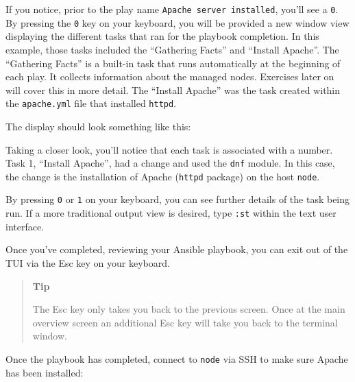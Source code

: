 If you notice, prior to the play name
\texttt{Apache\ server\ installed}, you'll see a \texttt{0}. By pressing
the \texttt{0} key on your keyboard, you will be provided a new window
view displaying the different tasks that ran for the playbook
completion. In this example, those tasks included the ``Gathering
Facts'' and ``Install Apache''. The ``Gathering Facts'' is a built-in
task that runs automatically at the beginning of each play. It collects
information about the managed nodes. Exercises later on will cover this
in more detail. The ``Install Apache'' was the task created within the
\texttt{apache.yml} file that installed \texttt{httpd}.

The display should look something like this:

\begin{Shaded}
\begin{Highlighting}[]
\end{Highlighting}
\end{Shaded}

Taking a closer look, you'll notice that each task is associated with a
number. Task 1, ``Install Apache'', had a change and used the
\texttt{dnf} module. In this case, the change is the installation of
Apache (\texttt{httpd} package) on the host \texttt{node}.

By pressing \texttt{0} or \texttt{1} on your keyboard, you can see
further details of the task being run. If a more traditional output view
is desired, type \texttt{:st} within the text user interface.

Once you've completed, reviewing your Ansible playbook, you can exit out
of the TUI via the Esc key on your keyboard.

\begin{quote}
\textbf{Tip}

The Esc key only takes you back to the previous screen. Once at the main
overview screen an additional Esc key will take you back to the terminal
window.
\end{quote}

Once the playbook has completed, connect to \texttt{node} via SSH to
make sure Apache has been installed:

